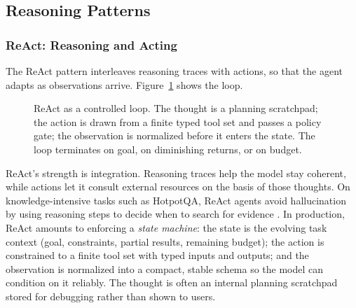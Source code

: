\documentclass[11pt]{book}
\begin{document}
\subsection{Reasoning Patterns}

\subsubsection{ReAct: Reasoning and Acting}

The ReAct pattern \cite{react2022} interleaves reasoning traces with actions, so that the agent adapts as observations arrive. Figure~\ref{fig:react} shows the loop.

\begin{figure}[htbp]
\centering
{}
\caption{ReAct as a controlled loop. The thought is a planning scratchpad; the action is drawn from a finite typed tool set and passes a policy gate; the observation is normalized before it enters the state. The loop terminates on goal, on diminishing returns, or on budget.}
\label{fig:react}
\end{figure}

ReAct's strength is integration. Reasoning traces help the model stay coherent, while actions let it consult external resources on the basis of those thoughts. On knowledge-intensive tasks such as HotpotQA, ReAct agents avoid hallucination by using reasoning steps to decide when to search for evidence \cite{react2022}. In production, ReAct amounts to enforcing a \textit{state machine}: the state is the evolving task context (goal, constraints, partial results, remaining budget); the action is constrained to a finite tool set with typed inputs and outputs; and the observation is normalized into a compact, stable schema so the model can condition on it reliably. The thought is often an internal planning scratchpad stored for debugging rather than shown to users.
\end{document}
